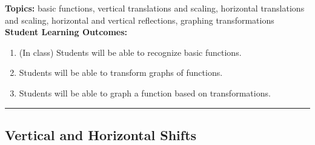 

\noindent \textbf{Topics:}  basic functions, vertical translations and scaling, horizontal translations and scaling, horizontal and vertical reflections, graphing transformations\\

\noindent \textbf{Student Learning Outcomes:}
\begin{enumerate}
\item (In class) Students will be able to recognize basic functions.
\item Students will be able to transform graphs of functions.
\item Students will be able to graph a function based on transformations.
\end{enumerate}

\hrule 

\bigskip


\subsection{Vertical and Horizontal Shifts} ~

\noindent
{}

